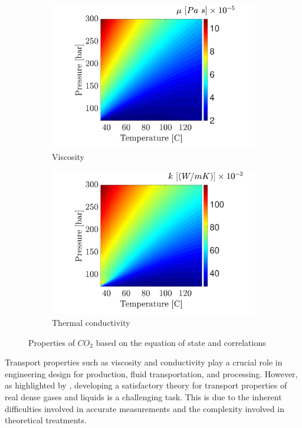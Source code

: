 \documentclass[../Article_Sensitivity_Analsysis.tex]{subfiles}
\begin{document}
\begin{figure}[H]
\begin{subfigure}[b]{0.32\textwidth}
			\includegraphics[trim = 3.5cm 0cm 1.5cm 0cm,clip,width=\textwidth]{Figures/MU.pdf}
			\caption{Viscosity}
			\label{fig: SFE_Properties_Viscosity}
		\end{subfigure}
		\hfill
		\begin{subfigure}[b]{0.32\textwidth}
			\centering
			\includegraphics[trim = 3.5cm 0cm 1.5cm 0cm,clip,width=\textwidth]{Figures/KT.pdf}	
			\caption{Thermal conductivity}
			\label{fig: SFE_Properties_Thermal}
		\end{subfigure}
		\caption{Properties of $CO_2$ based on the equation of state and correlations}
		\label{fig: SFE_Properties}
	\end{figure}    
	
	Transport properties such as viscosity and conductivity play a crucial role in engineering design for production, fluid transportation, and processing. However, as highlighted by \citet{Sheng1989}, developing a satisfactory theory for transport properties of real dense gases and liquids is a challenging task. This is due to the inherent difficulties involved in accurate measurements and the complexity involved in theoretical treatments.
	
\end{document}
